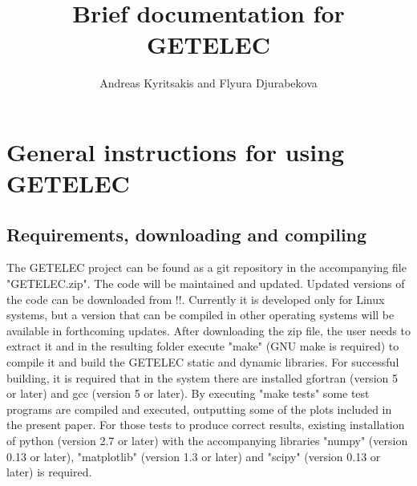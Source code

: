 \documentclass[notitlepage
]{revtex4-1}
\begin{document}
\title{Brief documentation for GETELEC}

\author{Andreas Kyritsakis and Flyura Djurabekova}


\maketitle


\section{General instructions for using GETELEC}
\label{sec:Gen}

\subsection{Requirements, downloading and compiling}

The GETELEC project can be found as a git repository in the accompanying file "GETELEC.zip". The code will be maintained and updated. Updated versions of the code can be downloaded from !!. Currently it is developed only for Linux systems, but a version that can be compiled in other operating systems will be available in forthcoming updates. After downloading the zip file, the user needs to extract it and in the resulting folder execute "make" (GNU make is required) to compile it and build the GETELEC static and dynamic libraries. For successful building, it is required that in the system there are installed gfortran (version 5 or later) and gcc (version 5 or later). By executing "make tests" some test programs are compiled and executed, outputting some of the plots included in the present paper. For those tests to produce correct results, existing installation of python (version 2.7 or later) with the accompanying libraries "numpy" (version 0.13 or later), "matplotlib" (version 1.3 or later) and "scipy" (version 0.13 or later) is required.
\end{document}
